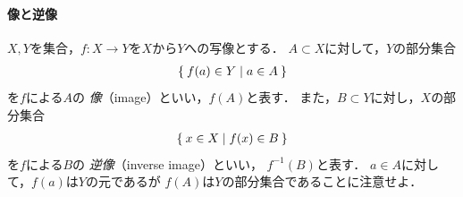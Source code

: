    \paragraph{像と逆像}
    $X,  Y$を集合，$f: X \longrightarrow Y$を$X$から$Y$への写像とする．
    $A \subset X$に対して，$Y$の部分集合
    \begin{align}
      \Set{ f(a) \in Y \mid a \in A}
      \label{eq:imegeset}
    \end{align}
    を$f$による$A$の
    \emph{像}（image）といい，$f(A)$と表す．
    また，$B \subset Y$に対し，$X$の部分集合
    \begin{align}
      \Set{ x \in X \mid f(x) \in B}
      \label{eq:inverseimageset}
    \end{align}
    を$f$による$B$の
    \emph{逆像}（inverse image）といい，
    $f^{-1} (B)$と表す．
    $a \in A$に対して，$f(a)$は$Y$の元であるが
    $f(A)$は$Y$の部分集合であることに注意せよ．

